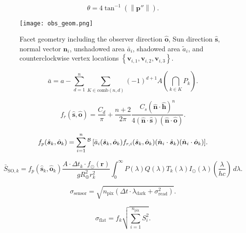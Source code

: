 \documentclass[a4paper,twocolumn]{spaceDebrisC} %
\newcommand{\vctr}[1]{\bm{#1}}
\newcommand{\unitv}[1]{\hat{\vctr{#1}}}
\newcommand{\preup}[1]{\prescript{#1}{}{}}
\newcommand{\rf}[1]{\mathcal{\MakeUppercase{#1}}}
\newcommand{\prf}[1]{\preup{\rf{#1}}}
\newcommand{\norm}[1]{\left\lVert#1\right\rVert}
\newcommand{\figmed}[0]{0.6\textwidth}
\begin{document}
\begin{equation} \label{eq:angle_error}
  \theta = 4 \tan^{-1} \left( \norm{\vctr{p}''} \right).
\end{equation}

\begin{figure}[ht]
  \centering
  \texttt{[image: obs\_geom.png]}
  \caption{Facet geometry including the observer direction $\unitv{o}$, Sun direction $\unitv{s}$, normal vector $\unitv{n}_i$, unshadowed area $\bar{a}_i$, shadowed area $\tilde{a}_i$, and counterclockwise vertex locations $\left\{ \vctr{v}_{i,1}, \vctr{v}_{i,2}, \vctr{v}_{i,3} \right\}$. }
  \label{fig:facet_geom}
\end{figure}

\begin{equation} \label{eq:us_area}
  \bar{a} = a - \sum_{d=1}^{n} \sum_{K \in \text{comb}(n,d)} (-1)^{d+1} A\left(\bigcap\limits_{k \in K} P_k\right).
\end{equation}

\begin{equation} \label{eq:brdf_blinn_phong}
  f_r(\unitv{s}, \unitv{o}) = \frac{C_d}{\pi} + \frac{n+2}{2\pi} \frac{C_s (\unitv{n} \cdot \unitv{h})^n}{4 (\unitv{n} \cdot \unitv{s})(\unitv{n} \cdot \unitv{o})}.
 \end{equation}

 \begin{equation} \label{eq:lc_norm}
  f_p(\unitv{s}_k, \unitv{o}_k) = \sum_{i=1}^n{\prf{B}\left[\bar{a}_i(\unitv{s}_k, \unitv{o}_k)
  f_{r,i}(\unitv{s}_k, \unitv{o}_k)
   (\unitv{n}_i \cdot \unitv{s}_k)
   (\unitv{n}_i \cdot \unitv{o}_k)
   \right]}. 
 \end{equation}

 \begin{equation} \label{eq:general_bright}
  \bar{S}_{\text{SO},k} = f_p(\unitv{s}_k, \unitv{o}_k) \frac{A \cdot \Delta t_k \cdot f_\odot(\vctr{r})}{g R_\oplus^2 r_k^2} \int_{0}^{\infty}{P(\lambda)Q(\lambda)T_k(\lambda) I_\odot(\lambda) \left(\frac{\lambda}{hc}\right)}\,d\lambda. 
\end{equation}

\begin{equation} \label{eq:sensor_noise}
  \sigma_\text{sensor} = \sqrt{n_\text{pix} \left( \Delta t \cdot \lambda_\text{dark} + \sigma_\text{read}^2 \right)}.
\end{equation}

\begin{equation}
  \sigma_\text{flat} = f_k \sqrt{\sum_{i=1}^{n_\text{pix}} S_i^2}.
\end{equation}
\end{document}
